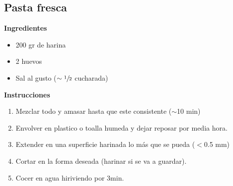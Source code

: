 \subsection{Pasta fresca}
\textbf{Ingredientes}
\begin{itemize}
\item 200 gr de harina
\item 2 huevos
\item Sal al gusto ($\sim \sfrac{1}{2}$ cucharada)
\end{itemize}

\textbf{Instrucciones}
\begin{enumerate}
\item Mezclar todo y amasar hasta que este consistente ($\sim$10 min)
\item Envolver en plastico o toalla humeda y dejar reposar por media hora.
\item Extender en una superficie harinada lo m\'as que se pueda ($<$0.5 mm)
\item Cortar en la forma deseada (harinar si se va a guardar).
\item Cocer en agua hiriviendo por 3min.
\end{enumerate}
